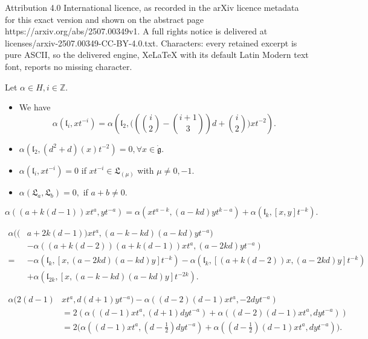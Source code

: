 \documentclass[10pt,a4paper]{amsart}
\def\bZ{\mathbb{Z}}
\def\dg{\dot{\mathfrak{g}}}
\def\fL{\mathfrak{L}}
\def\fl{\mathfrak{l}}
\begin{document}
Attribution 4.0 International licence, as recorded in the arXiv licence metadata for this exact version and shown on the abstract page https://arxiv.org/abs/2507.00349v1. A full rights notice is delivered at licenses/arxiv-2507.00349-CC-BY-4.0.txt. Characters: every retained excerpt is pure ASCII, so the delivered engine, XeLaTeX with its default Latin Modern text font, reports no missing character.
\begin{lemm} \label{lemm-6} Let  $\alpha\in H, i\in \bZ$.
	\begin{itemize}
		\item[(a).]
 We have \begin{equation}\label{d-g-4}\alpha(\fl_{i},xt^{-i})=\alpha\left(\fl_2,\Big((\binom i2-\binom {i+1}3)d+\binom i2\Big)xt^{-2}\right).\end{equation}
 	\item[(b).]
$ \alpha(\fl_2,(d^2+d)(x)t^{-2})=0,\forall x\in \dg.$
 	\item[(c).]   $\alpha(\fl_{i},xt^{-i})=0$ if $xt^{-i}\in \fL_{(\mu)}$ with $\mu\ne0, -1$.
 		\item[(d).] $\alpha(\fL_a,\fL_b)=0,$ if $ a+b\ne 0$.
 		\end{itemize}\end{lemm}

\begin{equation}\label{g-g-1}\alpha((a+k(d-1))xt^a,yt^{-a})=\alpha(xt^{a-k},(a-kd)yt^{k-a})+\alpha(\fl_{k},[x,y]t^{-k}).\end{equation}

\begin{equation}\label{o-m}\begin{aligned}\alpha((&a+2k(d-1))xt^a,(a-k-kd)(a-kd)yt^{-a})\\& -\alpha((a+k(d-2))(a+k(d-1))xt^a,(a-2kd)yt^{-a})\\
=&-\alpha(\fl_{k},[x,(a-2kd)(a-kd)y]t^{-k}) -\alpha(\fl_{k},[(a+k(d-2))x,(a-2kd)y]t^{-k})
\\&+\alpha(\fl_{2k},[x,(a-k-kd)(a-kd)y]t^{-2k}).\end{aligned}\end{equation}

\begin{equation}\label{lhd}\begin{aligned} \alpha(2(d-1)&xt^a, d(d+1)yt^{-a})-\alpha((d-2)(d-1)xt^a,-2dyt^{-a})\\
&=2(\alpha((d-1)xt^a, (d+1)dyt^{-a})+\alpha((d-2)(d-1)xt^a,dyt^{-a}))\\
&=2\Big(\alpha((d-1)xt^a, (d-\frac 12)dyt^{-a})+\alpha((d-\frac 12)(d-1)xt^a,dyt^{-a})\Big).\end{aligned}\end{equation}
\end{document}
